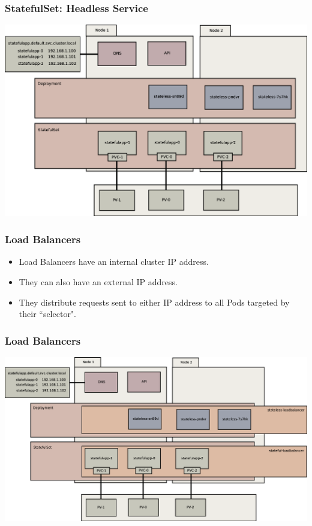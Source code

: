     \begin{frame}
        \frametitle{StatefulSet: Headless Service}
        \includegraphics[width=\textwidth,height=0.85\textheight,keepaspectratio]{graphics/07-persistentIdentity.eps}
    \end{frame}

    \begin{frame}
        \frametitle{Load Balancers}
        \begin{itemize}
            \item Load Balancers have an internal cluster IP address.\pause
            \item They can also have an external IP address.\pause
            \item They distribute requests sent to either IP address to all Pods targeted by their ``selector".
        \end{itemize}
    \end{frame}

    \begin{frame}
        \frametitle{Load Balancers}
        \includegraphics[width=\textwidth,height=0.85\textheight,keepaspectratio]{graphics/08-loadBalancer.eps}
    \end{frame}

